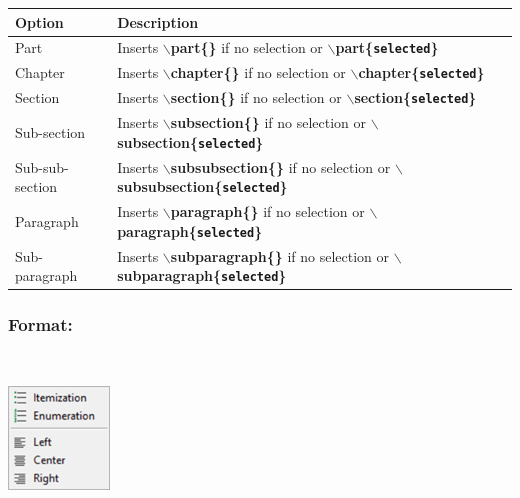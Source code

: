 \begin{scriptsize}
  \begin{tabularx}{\textwidth}{>{\hsize=0.2\hsize}X>{\hsize=0.8\hsize}X}\\
    \hline
    \textbf{Option} & \textbf{Description} \\
    \hline
    Part & Inserts \textbf{$\backslash$part\{\}} if no selection or
     \textbf{$\backslash$part\{\texttt{selected}\}} \\
    Chapter & Inserts \textbf{$\backslash$chapter\{\}} if no selection or
     \textbf{$\backslash$chapter\{\texttt{selected}\}} \\
    Section & Inserts \textbf{$\backslash$section\{\}} if no selection or
     \textbf{$\backslash$section\{\texttt{selected}\}} \\
    Sub-section & Inserts \textbf{$\backslash$subsection\{\}} if no selection or
     \textbf{$\backslash$subsection\{\texttt{selected}\}} \\
    Sub-sub-section & Inserts \textbf{$\backslash$subsubsection\{\}} if no selection or
     \textbf{$\backslash$subsubsection\{\texttt{selected}\}} \\
    Paragraph & Inserts \textbf{$\backslash$paragraph\{\}} if no selection or
     \textbf{$\backslash$paragraph\{\texttt{selected}\}} \\
    Sub-paragraph & Inserts \textbf{$\backslash$subparagraph\{\}} if no selection or
     \textbf{$\backslash$subparagraph\{\texttt{selected}\}} \\
    \hline
  \end{tabularx}
\end{scriptsize}


\hypertarget{menu_insert_latex_format}{}
\subsubsection{Format:}\\

\includegraphics[scale=0.8]{./res/menu_insert_latex_format.png}\\

